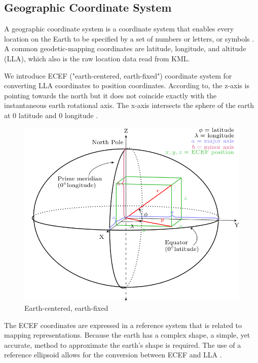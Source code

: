 \subsection{Geographic Coordinate System}

A geographic coordinate system is a coordinate system that enables every location on the Earth to be specified by a set of numbers or letters, or symbols \cite{wiki.geographic-coordinate-system.2016}. A common geodetic-mapping coordinates are latitude, longitude, and altitude (LLA), which also is the raw location data read from KML.

We introduce ECEF ("earth-centered, earth-fixed") coordinate system for converting LLA coordinates to position coordinates. According to, the z-axis is pointing towards the north but it does not coincide exactly with the instantaneous earth rotational axis. The x-axis intersects the sphere of the earth at $0$ latitude and $0$ longitude \cite{wiki.ecef.2016}.

\begin{figure}[H]
\caption[ECEF]{Earth-centered, earth-fixed \cite{wiki.ecef.2016}}
\label{fig:ecef}
\centering
\includegraphics[width=\linewidth]{Figures/ecef.png}
\decoRule
\end{figure}

The ECEF coordinates are expressed in a reference system that is related to mapping representations. Because the earth has a complex shape, a simple, yet accurate, method to approximate the earth’s shape is required. The use of a reference ellipsoid allows for the conversion between ECEF and LLA \cite{ublox.datum.1999}.


